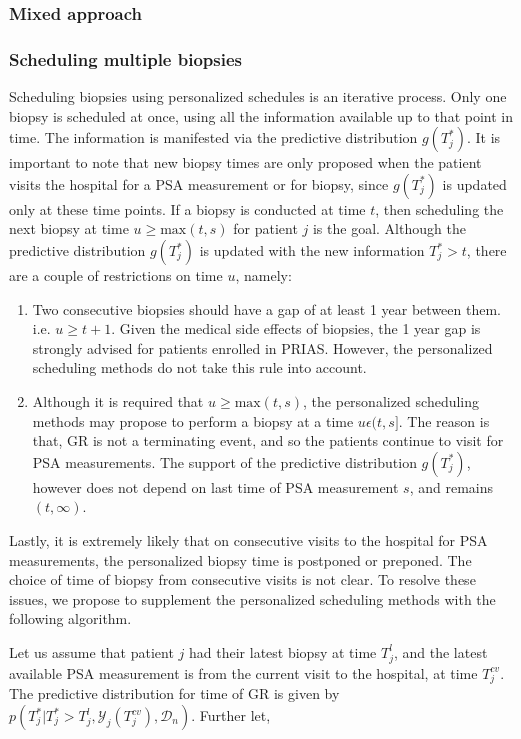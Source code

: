 \subsubsection{Mixed approach}

\subsubsection{Scheduling multiple biopsies}
\label{subsubsec : pers_sched_algorithm}
Scheduling biopsies using personalized schedules is an iterative process. Only one biopsy is scheduled at once, using all the information available up to that point in time. The information is manifested via the predictive distribution $g(T^*_j)$. It is important to note that new biopsy times are only proposed when the patient visits the hospital for a PSA measurement or for biopsy, since $g(T^*_j)$ is updated only at these time points. If a biopsy is conducted at time $t$, then scheduling the next biopsy at time $u \geq \text{max}(t,s)$ for patient $j$ is the goal. Although the predictive distribution $g(T^*_j)$ is updated with the new information $T^*_j > t$, there are a couple of restrictions on time $u$, namely:

\begin{enumerate}
\item Two consecutive biopsies should have a gap of at least 1 year between them. i.e. $u \geq t + 1$. Given the medical side effects of biopsies, the 1 year gap is strongly advised for patients enrolled in PRIAS. However, the personalized scheduling methods do not take this rule into account.
\item Although it is required that $u \geq \text{max}(t,s)$, the personalized scheduling methods may propose to perform a biopsy at a time $u \epsilon (t, s]$. The reason is that, GR is not a terminating event, and so the patients continue to visit for PSA measurements. The support of the predictive distribution $g(T^*_j)$, however does not depend on last time of PSA measurement $s$, and remains $(t, \infty)$.
\end{enumerate}
 
Lastly, it is extremely likely that on consecutive visits to the hospital for PSA measurements, the personalized biopsy time is postponed or preponed. The choice of time of biopsy from consecutive visits is not clear. To resolve these issues, we propose to supplement the personalized scheduling methods with the following algorithm.

Let us assume that patient $j$ had their latest biopsy at time $T^l_j$, and the latest available PSA measurement is from the current visit to the hospital, at time $T^{cv}_j$. The predictive distribution for time of GR is given by $p(T^*_j|T^*_j > T^l_j, \mathcal{Y}_j(T^{cv}_j), \mathcal{D}_n)$. Further let,

